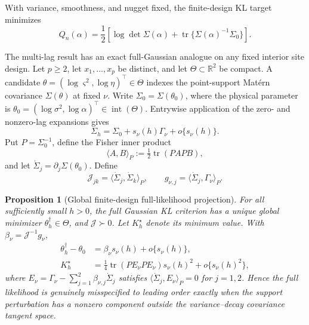 \documentclass[sigconf]{acmart}
\newtheorem{proposition}{Proposition}
\theoremstyle{remark}
\newcommand{\R}{\mathbb R}
\newcommand{\tr}{\operatorname{tr}}
\begin{document}
With variance, smoothness, and nugget fixed, the finite-design KL target
minimizes
\begin{equation}
Q_n(\alpha)=\frac12\left[
\log\det\Sigma(\alpha)+
\tr\{\Sigma(\alpha)^{-1}\Sigma_0\}\right].
\label{eq:kl}
\end{equation}

The multi-lag result has an exact full-Gaussian analogue on any fixed interior
site design. Let \(p\geq2\), let \(x_1,\ldots,x_p\) be distinct, and let
\(\Theta\subset\R^2\) be compact. A candidate
\(\theta=(\log\varsigma^2,\log\eta)^\top\in\Theta\) indexes the point-support
Matérn covariance \(\Sigma(\theta)\) at fixed \(\nu\). Write
\(\Sigma_0=\Sigma(\theta_0)\), where the physical parameter is
\(\theta_0=(\log\sigma^2,\log\alpha)^\top\in\operatorname{int}(\Theta)\). Entrywise
application of the zero- and nonzero-lag expansions gives
\begin{equation}
 \Sigma_h=\Sigma_0+s_\nu(h)\Gamma_\nu+o\{s_\nu(h)\}.
 \label{eq:matrix-perturbation}
\end{equation}
Put \(P=\Sigma_0^{-1}\), define the Fisher inner product
\begin{equation}
 \langle A,B\rangle_P:=\tfrac12\tr(PAPB),
 \label{eq:fisher-inner-product}
\end{equation}
and let \(\dot\Sigma_j=\partial_j\Sigma(\theta_0)\). Define
\begin{equation}
 \mathcal J_{jk}=\langle\dot\Sigma_j,\dot\Sigma_k\rangle_P,
 \qquad g_{\nu,j}=\langle\dot\Sigma_j,\Gamma_\nu\rangle_P.
\end{equation}

\begin{proposition}[Global finite-design full-likelihood projection]
\label{prop:full-projection}
For all sufficiently small \(h>0\), the full Gaussian KL criterion has a
unique global minimizer \(\theta_h^\dagger\in\Theta\), and
\(\mathcal J\succ0\). Let \(K_h^\star\) denote its minimum value. With
\(\beta_\nu=\mathcal J^{-1}g_\nu\),
\begin{align}
 \theta_h^\dagger-\theta_0&=\beta_\nu s_\nu(h)+o\{s_\nu(h)\},
 \label{eq:full-shift}\\
 K_h^\star&=\tfrac14\tr(PE_\nu PE_\nu)s_\nu(h)^2
 +o\{s_\nu(h)^2\},
 \label{eq:full-kl}
\end{align}
where \(E_\nu=\Gamma_\nu-\sum_{j=1}^2\beta_{\nu,j}\dot\Sigma_j\) satisfies
\(\langle\dot\Sigma_j,E_\nu\rangle_P=0\) for \(j=1,2\). Hence the full
likelihood is genuinely misspecified to leading order exactly when the support
perturbation has a nonzero component outside the variance--decay covariance
tangent space.
\end{proposition}
\end{document}
